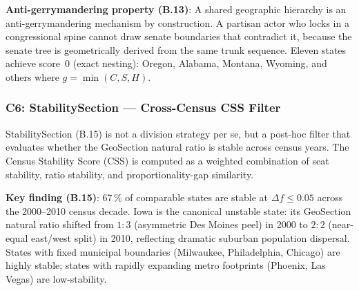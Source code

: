 \textbf{Anti-gerrymandering property (B.13)}: A shared geographic hierarchy
is an anti-gerrymandering mechanism by construction.
A partisan actor who locks in a congressional spine cannot draw senate boundaries
that contradict it, because the senate tree is geometrically derived from the
same trunk sequence.
Eleven states achieve score~0 (exact nesting): Oregon, Alabama, Montana, Wyoming,
and others where $g = \min(C, S, H)$.

\subsubsection*{C6: StabilitySection --- Cross-Census CSS Filter}

StabilitySection (B.15) is not a division strategy per se, but a post-hoc
filter that evaluates whether the GeoSection natural ratio is stable across
census years.
The Census Stability Score (CSS) is computed as a weighted combination of
seat stability, ratio stability, and proportionality-gap similarity.

\textbf{Key finding (B.15)}: 67\,\% of comparable states are stable at
$\Delta f \leq 0.05$ across the 2000--2010 census decade.
Iowa is the canonical unstable state: its GeoSection natural ratio shifted from
$1:3$ (asymmetric Des Moines peel) in 2000 to $2:2$ (near-equal east/west split)
in 2010, reflecting dramatic suburban population dispersal.
States with fixed municipal boundaries (Milwaukee, Philadelphia, Chicago) are
highly stable; states with rapidly expanding metro footprints (Phoenix, Las Vegas)
are low-stability.

